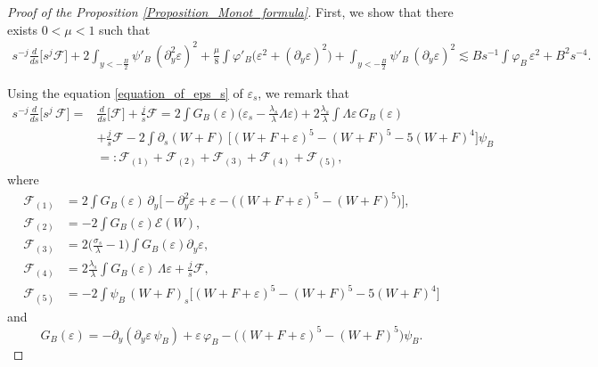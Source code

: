 \documentclass[16pt,english, oneside,reqno]{smfart}
\newcommand{\vare}{{\varepsilon}}
\newcommand{\vphi}{{\varphi}}
\begin{document}
\vspace{0.4cm}
\begin{proof}[Proof of the Proposition \ref{Proposition_Monot_formula}]
First, we show that there exists $0<\mu<1$ such that
\begin{equation}\label{mathcalF_estim_on_all_dds}
\begin{split}
    s^{-j}\frac{d}{ds}\big[s^j \mathcal{F} \big]  + 2\int_{y<-\frac B2} \psi'_B\,(\partial^2_y \vare)^2
    +\frac\mu 8 \int \vphi'_B \big( \vare^2 + (\partial_y \vare)^2 \big) + \int_{y<-\frac B2} \psi'_B\,(\partial_y \vare)^2 \lesssim B s^{-1}\int \vphi_B \,\vare^2 + B^2 s^{-4}.
\end{split}
\end{equation}

Using the equation \eqref{equation_of_eps_s} of $\vare_s$, we remark that
\begin{equation}
    \begin{split}
        s^{-j}\frac{d}{ds}\big[s^j\, \mathcal{F}\big]  
        = & \frac{d}{ds}\big[\mathcal{F}\big]+ \frac js\mathcal{F} = 2\int G_B(\vare)\big( \vare_s - \frac{\lambda_s}{\lambda}\Lambda \vare \big) + 2\frac{\lambda_
        s}{\lambda}\int \Lambda \vare\, G_B(\vare) \\
        & + \frac{j}{s}\mathcal{F} - 2 \int \partial_s(W+F)\, \big[ (W+F+\vare)^5 - (W+F)^5 - 5(W+F)^4 \big] \psi_B \\
        & =:\mathcal{F}_{(1)}+\mathcal{F}_{(2)}+\mathcal{F}_{(3)}+\mathcal{F}_{(4)}+\mathcal{F}_{(5)},
    \end{split}
\end{equation}
where
\begin{equation}
\begin{split}
    \mathcal{F}_{(1)} &= 2 \int G_B(\vare) \, \partial_y\Big[ -\partial^2_{y}\vare + \vare - \big( (W+F+\vare)^5 - (W+F)^5 \big)\Big],\\
    \mathcal{F}_{(2)} &= -2\int G_B(\vare)\mathcal{E}(W),\\
    \mathcal{F}_{(3)}&= 2 \Big(\frac{\sigma_s}{\lambda}-1\Big) \int G_B(\vare) \partial_y \vare,\\
    \mathcal{F}_{(4)} &= 2\frac{\lambda_s}{\lambda}\int G_B(\vare)\, \Lambda \vare + \frac{j}{s}\mathcal{F}, \\
    \mathcal{F}_{(5)} &= -2 \int \psi_B\, (W+F)_s \Big[ (W+F+\vare)^5 - (W+F)^5 - 5(W+F)^4\Big]
\end{split}
\end{equation}
and
\begin{equation}
    G_B(\vare) = -\partial_y(\partial_y \vare \, \psi_B) + \vare \, \vphi_B - \big( (W+F+\vare)^5 - (W+F)^5\big)\psi_B.
\end{equation}


\end{proof}
\end{document}
